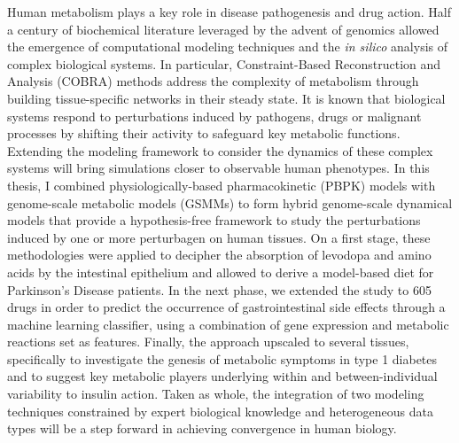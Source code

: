 Human metabolism plays a key role in disease pathogenesis and drug action. Half a century of biochemical literature leveraged by the advent of genomics allowed the emergence of computational modeling techniques and the \textit{in silico} analysis of complex biological systems. In particular, Constraint-Based Reconstruction and Analysis (COBRA) methods address the complexity of metabolism through building tissue-specific networks in their steady state. It is known that biological systems respond to perturbations induced by pathogens, drugs or malignant processes by shifting their activity to safeguard key metabolic functions. Extending the modeling framework to consider the dynamics of these  complex systems will bring simulations closer to observable human phenotypes. 
In this thesis, I combined physiologically-based pharmacokinetic (PBPK) models with genome-scale metabolic models (GSMMs) to form hybrid genome-scale dynamical models that provide a hypothesis-free framework to study the perturbations induced by one or more perturbagen on human tissues. On a first stage, these methodologies were applied to decipher the absorption of levodopa and amino acids by the intestinal epithelium and allowed to derive a model-based diet for Parkinson's Disease patients. In the next phase, we extended the study to 605 drugs in order to predict the occurrence of gastrointestinal side effects through a machine learning classifier, using a combination of gene expression and metabolic reactions set as features. Finally, the approach upscaled to several tissues, specifically to investigate the genesis of metabolic symptoms in type 1 diabetes and to suggest key metabolic players underlying within and between-individual variability to insulin action. Taken as whole, the integration of two modeling techniques constrained by expert biological knowledge and heterogeneous data types will be a step forward in achieving convergence in human biology.